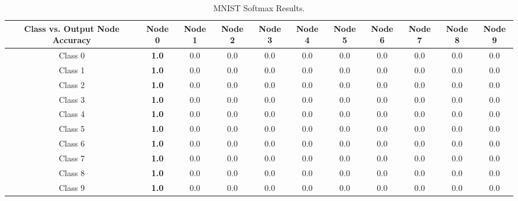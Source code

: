 \documentclass[journal]{IEEEtran}
\begin{document}
    \begin{table}
      \renewcommand{\arraystretch}{1.3}
      \caption{MNIST Softmax Results.}
      \label{tab_har_sfx_all}
      \centering
      \begin{tabular}{|c|c|c|c|c|c|c|c|c|c|c|}
      \hline
      Class vs. Output Node Accuracy & Node 0 & Node 1 & Node 2 & Node 3 & Node 4 & Node 5& Node 6 & Node 7 & Node 8 & Node 9\\
      \hline
      \hline
      Class 0   &  \textbf{1.0}   & 0.0  &  0.0     & 0.0 &  0.0    & 0.0&  0.0    & 0.0  &  0.0    & 0.0\\
      \hline
      Class 1   &  \textbf{1.0}   & 0.0  &  0.0     & 0.0 &  0.0    & 0.0&  0.0    & 0.0  &  0.0    & 0.0\\
      \hline
      Class 2   &  \textbf{1.0}   & 0.0  &  0.0     & 0.0 &  0.0    & 0.0&  0.0    & 0.0  &  0.0    & 0.0\\
      \hline
      Class 3   &  \textbf{1.0}   & 0.0  &  0.0     & 0.0 &  0.0    & 0.0&  0.0    & 0.0  &  0.0    & 0.0\\
      \hline
      Class 4   &  \textbf{1.0}   & 0.0  &  0.0     & 0.0 &  0.0    & 0.0&  0.0    & 0.0  &  0.0    & 0.0\\
      \hline
      Class 5   &  \textbf{1.0}   & 0.0  &  0.0     & 0.0 &  0.0    & 0.0&  0.0    & 0.0  &  0.0    & 0.0\\
      \hline
      Class 6   &  \textbf{1.0}   & 0.0  &  0.0     & 0.0 &  0.0    & 0.0&  0.0    & 0.0  &  0.0    & 0.0\\
      \hline
      Class 7   &  \textbf{1.0}   & 0.0  &  0.0     & 0.0 &  0.0    & 0.0&  0.0    & 0.0  &  0.0    & 0.0\\
      \hline
      Class 8   &  \textbf{1.0}   & 0.0  &  0.0     & 0.0 &  0.0    & 0.0&  0.0    & 0.0  &  0.0    & 0.0\\
      \hline
      Class 9   &  \textbf{1.0}   & 0.0  &  0.0     & 0.0 &  0.0    & 0.0&  0.0    & 0.0  &  0.0    & 0.0\\
      \hline
      \end{tabular}
      \end{table}
% 




\end{document}
